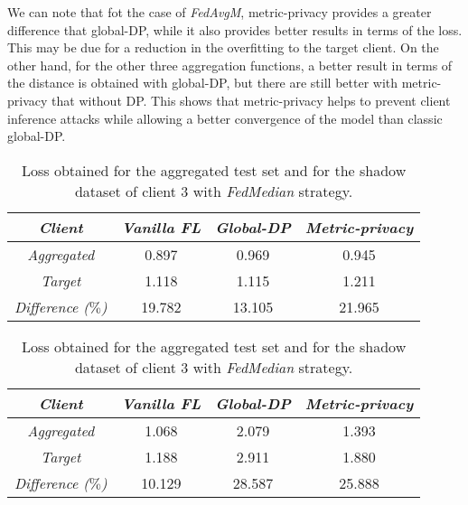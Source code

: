 \documentclass[5p,times]{elsarticle}
\begin{document}
We can note that fot the case of \textit{FedAvgM}, metric-privacy provides a greater difference that global-DP, while it also provides better results in terms of the loss. This may be due for a reduction in the overfitting to the target client. On the other hand, for the other three aggregation functions, a better result in terms of the distance is obtained with global-DP, but there are still better with metric-privacy that without DP. This shows that metric-privacy helps to prevent client inference attacks while allowing a better convergence of the model than classic global-DP.
\begin{table}[ht]
    \centering
    \begin{minipage}[t]{0.45\textwidth}
    \centering
    \begin{tabular}{cccc}
    \toprule
         \textit{\textbf{Client}} & \textit{\textbf{Vanilla FL}} & \textit{\textbf{Global-DP}} & \textit{\textbf{Metric-privacy}} \\
         \midrule
         \textit{Aggregated} & 0.897 & 0.969 & 0.945 \\ 
         \textit{Target}  & 1.118 & 1.115 & 1.211 \\ 
         \midrule
         \textit{Difference ($\%$)} & 19.782 & 13.105 & 21.965 \\ 
    \bottomrule
    \end{tabular}
    \caption{Loss obtained for the aggregated test set and for the shadow dataset of client 3 with \textit{FedAvgM} strategy.}
    \label{tab:ciattacks_example_fedavgm}
    \end{minipage}
    \hspace{0.05\textwidth} 
    \begin{minipage}[t]{0.45\textwidth}
    \centering
    \begin{tabular}{cccc}
    \toprule
         \textit{\textbf{Client}} & \textit{\textbf{Vanilla FL}} & \textit{\textbf{Global-DP}} & \textit{\textbf{Metric-privacy}} \\
         \midrule
         \textit{Aggregated} & 1.068 & 2.079 & 1.393 \\ 
         \textit{Target}  & 1.188 & 2.911 & 1.880 \\ 
         \midrule
         \textit{Difference ($\%$)} & 10.129 & 28.587 & 25.888 \\ 
    \bottomrule
    \end{tabular}
    \caption{Loss obtained for the aggregated test set and for the shadow dataset of client 3 with \textit{FedMedian} strategy.}
    \label{tab:ciattacks_example_fedmedian}
    \end{minipage}
\end{table}
\end{document}
